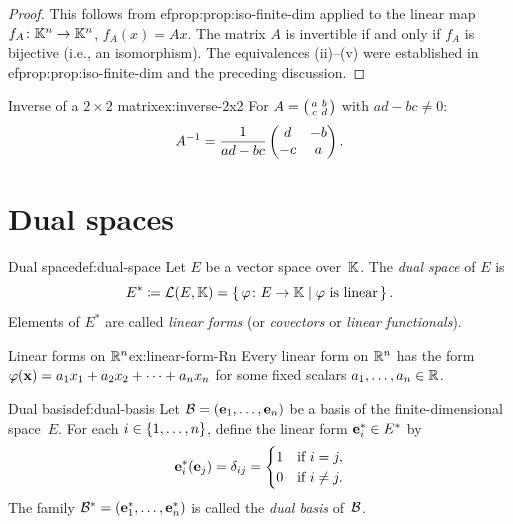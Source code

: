 \begin{proof}
This follows from 
ef{prop:prop:iso-finite-dim} applied to the linear map
$f_A\colon{\mathbb{K}}^n\to{\mathbb{K}}^n$, $f_A(x) = Ax$. The matrix $A$ is invertible if
and only if $f_A$ is bijective (i.e., an isomorphism). The equivalences
(ii)--(v) were established in 
ef{prop:prop:iso-finite-dim} and the
preceding discussion.
\end{proof}

\begin{example}{Inverse of a $2\times 2$ matrix}{ex:inverse-2x2}
For $A = \begin{psmallmatrix}a&b\\c&d\end{psmallmatrix}$ with
$ad-bc\neq 0$:
\[
  {A}^{-1} = \frac{1}{ad-bc}\begin{pmatrix}d & -b\\-c & a\end{pmatrix}.
\]
\end{example}


\section{Dual spaces}\label{sec:dual-spaces}

\begin{definition}{Dual space}{def:dual-space}
Let $E$ be a vector space over~${\mathbb{K}}$. The \emph{dual space} of $E$ is
\[
  E^* \coloneqq {\mathcal{L}}(E,{\mathbb{K}}) = \left\{\,\varphi\colon E\to{\mathbb{K}}\;\middle|\;\varphi
    \text{ is linear}\,\right\}.
\]
Elements of $E^*$ are called \emph{linear forms} (or \emph{covectors}
or \emph{linear functionals}).
\end{definition}

\begin{example}{Linear forms on ${\mathbb{R}}^n$}{ex:linear-form-Rn}
Every linear form on ${\mathbb{R}}^n$ has the form
$\varphi(\mathbf{x}) = a_1 x_1 + a_2 x_2 + \cdots + a_n x_n$
for some fixed scalars $a_1,\ldots,a_n\in{\mathbb{R}}$.
\end{example}

\begin{definition}{Dual basis}{def:dual-basis}
Let ${\mathcal{B}} = (\mathbf{e}_{1},\ldots,\mathbf{e}_{n})$ be a basis of the
finite-dimensional space~$E$. For each $i\in\left\{1,\ldots,n\right\}$, define
the linear form $\mathbf{e}_{i}^*\in E^*$ by
\[
  \mathbf{e}_{i}^*(\mathbf{e}_{j}) = \delta_{ij}
  = \begin{cases}1 & \text{if } i=j,\\0 & \text{if } i\neq j.\end{cases}
\]
The family ${\mathcal{B}}^* = (\mathbf{e}_{1}^*,\ldots,\mathbf{e}_{n}^*)$ is called the
\emph{dual basis} of~${\mathcal{B}}$.
\end{definition}

